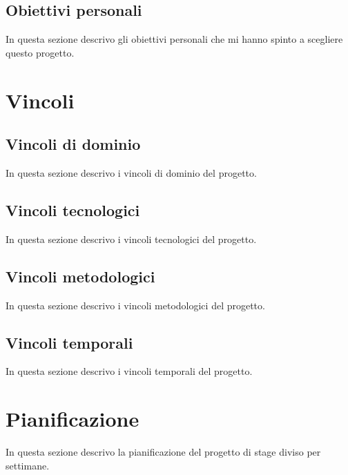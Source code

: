 \subsection{Obiettivi personali}
In questa sezione descrivo gli obiettivi personali che mi hanno spinto a scegliere questo progetto.

\section{Vincoli}

\subsection{Vincoli di dominio}
In questa sezione descrivo i vincoli di dominio del progetto.

\subsection{Vincoli tecnologici}
In questa sezione descrivo i vincoli tecnologici del progetto.

\subsection{Vincoli metodologici}
In questa sezione descrivo i vincoli metodologici del progetto.

\subsection{Vincoli temporali}
In questa sezione descrivo i vincoli temporali del progetto.

\section{Pianificazione}
In questa sezione descrivo la pianificazione del progetto di stage diviso per settimane.